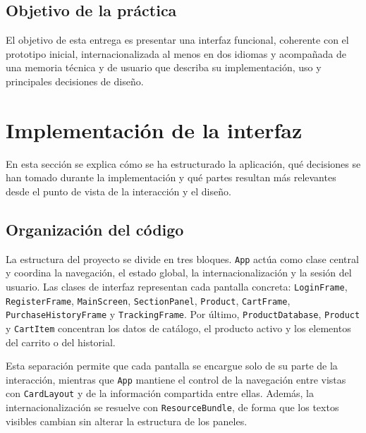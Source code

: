 \documentclass[12pt,a4paper]{article}
\begin{document}
\subsection*{Objetivo de la práctica}
El objetivo de esta entrega es presentar una interfaz funcional, coherente con el prototipo inicial, internacionalizada al menos en dos idiomas y acompañada de una memoria técnica y de usuario que describa su implementación, uso y principales decisiones de diseño.

\section{Implementación de la interfaz}

En esta sección se explica cómo se ha estructurado la aplicación, qué decisiones se han tomado durante la implementación y qué partes resultan más relevantes desde el punto de vista de la interacción y el diseño.

\subsection{Organización del código}

La estructura del proyecto se divide en tres bloques. \texttt{App} actúa como clase central y coordina la navegación, el estado global, la internacionalización y la sesión del usuario. Las clases de interfaz representan cada pantalla concreta: \texttt{LoginFrame}, \texttt{RegisterFrame}, \texttt{MainScreen}, \texttt{SectionPanel}, \texttt{Product}, \texttt{CartFrame}, \texttt{PurchaseHistoryFrame} y \texttt{TrackingFrame}. Por último, \texttt{ProductDatabase}, \texttt{Product} y \texttt{CartItem} concentran los datos de catálogo, el producto activo y los elementos del carrito o del historial.

Esta separación permite que cada pantalla se encargue solo de su parte de la interacción, mientras que \texttt{App} mantiene el control de la navegación entre vistas con \texttt{CardLayout} y de la información compartida entre ellas. Además, la internacionalización se resuelve con \texttt{ResourceBundle}, de forma que los textos visibles cambian sin alterar la estructura de los paneles.
\end{document}
